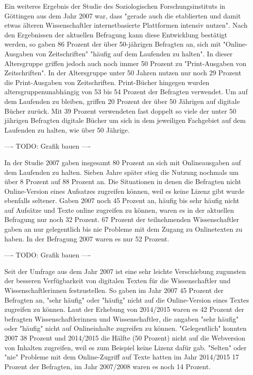 Ein weiteres Ergebnis der Studie des Soziologischen Forschungsinstituts in Göttingen aus dem Jahr 2007 war, dass "gerade auch die etablierten und damit etwas älteren Wissenschaftler internetbasierte Plattformen intensiv nutzen". Nach den Ergebnissen der aktuellen Befragung kann diese Entwicklung bestätigt werden, so gaben 86 Prozent der über 50-jährigen Befragten an, sich mit "Online-Ausgaben von Zeitschriften" "häufig auf dem Laufenden zu halten". In dieser Altersgruppe griffen jedoch auch noch immer 50 Prozent zu "Print-Ausgaben von Zeitschriften". In der Altersgruppe unter 50 Jahren nutzen nur noch 29 Prozent die Print-Ausgaben von Zeitschriften. Print-Bücher hingegen wurden altersgruppenunabhängig von 53 bis 54 Prozent der Befragten verwendet. Um auf dem Laufenden zu bleiben, griffen 20 Prozent der über 50 Jährigen auf digitale Bücher zurück. Mit 39 Prozent verwendeten fast doppelt so viele der unter 50 jährigen Befragten digitale Bücher um sich in dem jeweiligen Fachgebiet auf dem Laufenden zu halten, wie über 50 Jährige.

---- TODO: Grafik bauen ----

In der Studie 2007 gaben insgesamt 80 Prozent an sich mit Onlineausgaben auf dem Laufenden zu halten. Sieben Jahre später stieg die Nutzung nochmals um über 8 Prozent auf 88 Prozent an. Die Situationen in denen die Befragten nicht Online-Version eines Aufsatzes zugreifen können, weil es keine Lizenz gibt wurde ebenfalls seltener. Gaben 2007 noch 45 Prozent an, häufig bis sehr häufig nicht auf Aufsätze und Texte online zugreifen zu können, waren es in der aktuellen Befragung nur noch 32 Prozent. 67 Prozent der teilnehmenden Wissenschaftler gaben an nur gelegentlich bis nie Probleme mit dem Zugang zu Onlinetexten zu haben. In der Befragung 2007 waren es nur 52 Prozent.

---- TODO: Grafik bauen ----

Seit der Umfrage aus dem Jahr 2007 ist eine sehr leichte Verschiebung zu­guns­ten der besseren Verfügbarkeit von digitalen Texten für die Wissenschaftler und Wissenschaftlerinnen festzustellen. So gaben im Jahr 2007 45 Prozent der Befragten an, "sehr häufig" oder "häufig" nicht auf die Online-Version eines Textes zugreifen zu können. Laut der Erhebung von 2014/2015 waren es 42 Prozent der befragten Wissenschaftlerinnen und Wissenschaftler, die angaben "sehr häufig" oder "häufig" nicht auf Onlineinhalte zugreifen zu können. "Gelegentlich" konnten 2007 38 Prozent und 2014/2015 die Hälfte (50 Prozent) nicht auf die Webversion von Inhalten zugreifen, weil es zum Beispiel keine Lizenz dafür gab. "Selten" oder "nie" Probleme mit dem Online-Zugriff auf Texte hatten im Jahr 2014/2015 17 Prozent der Befragten, im Jahr 2007/2008 waren es noch 14 Prozent.

